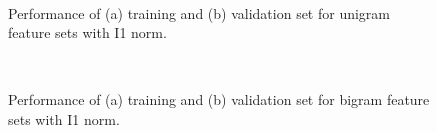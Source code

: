 \documentclass[11pt]{article}
\begin{document}
\begin{figure}[!h]
  \centering 
	\\%
  \caption{Performance of (a) training and (b) validation set for unigram feature sets with I1 norm.}
  \label{fig:I1_unigram}
\end{figure}

\begin{figure}[!h]
  \centering 
	\\%
  \caption{Performance of (a) training and (b) validation set for bigram feature sets with I1 norm.}
  \label{fig:I1_bigram}
\end{figure}
\end{document}
